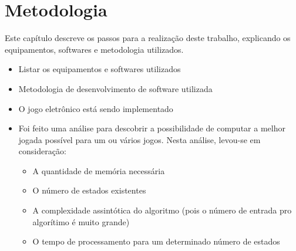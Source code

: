 \chapter[Metodologia]{Metodologia}
\label{cha:metodologia}
	Este capítulo descreve os passos para a realização deste trabalho, explicando os equipamentos, softwares e metodologia utilizados.

\begin{itemize}
\item
  Listar os equipamentos e softwares utilizados
\item
  Metodologia de desenvolvimento de software utilizada
\item
  O jogo eletrônico está sendo implementado
\item
  Foi feito uma análise para descobrir a possibilidade de computar a
  melhor jogada possível para um ou vários jogos. Nesta análise,
  levou-se em consideração:

  \begin{itemize}
  \tightlist
  \item
    A quantidade de memória necessária
  \item
    O número de estados existentes
  \item
    A complexidade assintótica do algoritmo (pois o número de entrada
    pro algorítimo é muito grande)
  \item
    O tempo de processamento para um determinado número de estados
  \end{itemize}
\end{itemize}
